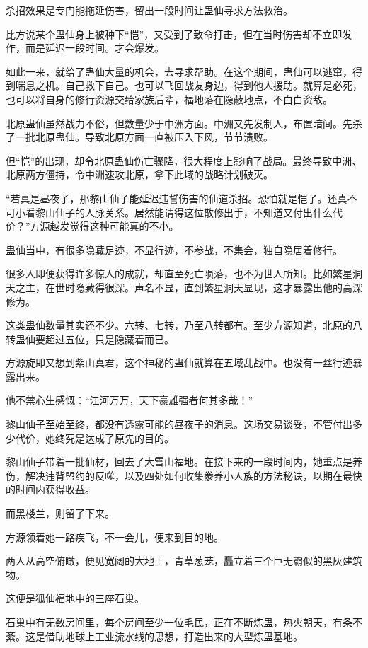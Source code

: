 \begin{this_body}
杀招效果是专门能拖延伤害，留出一段时间让蛊仙寻求方法救治。

比方说某个蛊仙身上被种下“恺”，又受到了致命打击，但在当时伤害却不立即发作，而是延迟一段时间。才会爆发。

如此一来，就给了蛊仙大量的机会，去寻求帮助。在这个期间，蛊仙可以逃窜，得到喘息之机。自己救下自己。也可以飞回战友身边，得到他人援助。就算是必死，也可以将自身的修行资源交给家族后辈，福地落在隐蔽地点，不白白资敌。

北原蛊仙虽然战力不俗，但数量少于中洲方面。中洲又先发制人，布置暗间。先杀了一批北原蛊仙。导致北原方面一直被压入下风，节节溃败。

但“恺”的出现，却令北原蛊仙伤亡骤降，很大程度上影响了战局。最终导致中洲、北原两方僵持，令中洲速攻北原，拿下此域的战略计划破灭。

“若真是昼夜子，那黎山仙子能延迟违誓伤害的仙道杀招。恐怕就是恺了。还真不可小看黎山仙子的人脉关系。居然能请得这位散修出手，不知道又付出什么代价？”方源越发觉得这种可能真的不小。

蛊仙当中，有很多隐藏足迹，不显行迹，不参战，不集会，独自隐居着修行。

很多人即便获得许多惊人的成就，却直至死亡陨落，也不为世人所知。比如繁星洞天之主，在世时隐藏得很深。声名不显，直到繁星洞天显现，这才暴露出他的高深修为。

这类蛊仙数量其实还不少。六转、七转，乃至八转都有。至少方源知道，北原的八转蛊仙要超过五位，只是隐藏着而已。

方源旋即又想到紫山真君，这个神秘的蛊仙就算在五域乱战中。也没有一丝行迹暴露出来。

他不禁心生感慨：“江河万万，天下豪雄强者何其多哉！”

黎山仙子至始至终，都没有透露可能的昼夜子的消息。这场交易谈妥，不管付出多少代价，她终究是达成了原先的目的。

黎山仙子带着一批仙材，回去了大雪山福地。在接下来的一段时间内，她重点是养伤，解决违背盟约的反噬，以及四处如何收集豢养小人族的方法秘诀，以期在最快的时间内获得收益。

而黑楼兰，则留了下来。

方源领着她一路疾飞，不一会儿，便来到目的地。

两人从高空俯瞰，便见宽阔的大地上，青草葱茏，矗立着三个巨无霸似的黑灰建筑物。

这便是狐仙福地中的三座石巢。

石巢中有无数房间里，每个房间至少一位毛民，正在不断炼蛊，热火朝天，有条不紊。这是借助地球上工业流水线的思想，打造出来的大型炼蛊基地。


\end{this_body}
